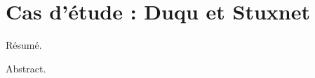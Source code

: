 \DontFrameThisInToc
\chapter{Cas d'étude : Duqu et Stuxnet}


\PutLineInToc

\PrintIndex

\onecolumn



\nocite{*}
% 
% 
% 
\DontFrameThisInToc
\printbibliography

\NumberAbstractPages
\begin{ThesisAbstract}
  \begin{FrenchAbstract}
    Résumé.
  \end{FrenchAbstract}
  \begin{EnglishAbstract}
    Abstract.
  \end{EnglishAbstract}
\end{ThesisAbstract}





